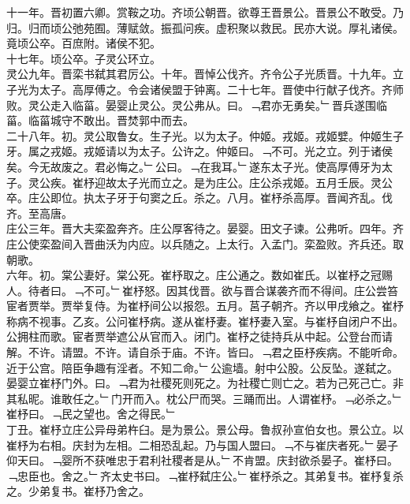 \documentclass{zhvt-classic}
\begin{document}
\hspace*{2em}十一年。晋初置六卿。赏鞍之功。齐顷公朝晋。欲尊王晋景公。晋景公不敢受。乃归。归而顷公弛苑囿。薄赋敛。振孤问疾。虚积聚以救民。民亦大说。厚礼诸侯。竟顷公卒。百庶附。诸侯不犯。\\
\hspace*{2em}十七年。顷公卒。子灵公环立。\\
\hspace*{2em}灵公九年。晋栾书弑其君厉公。十年。晋悼公伐齐。齐令公子光质晋。十九年。立子光为太子。高厚傅之。令会诸侯盟于钟离。二十七年。晋使中行献子伐齐。齐师败。灵公走入临菑。晏婴止灵公。灵公弗从。曰。﹁君亦无勇矣。﹂晋兵遂围临菑。临菑城守不敢出。晋焚郭中而去。\\
\hspace*{2em}二十八年。初。灵公取鲁女。生子光。以为太子。仲姬。戎姬。戎姬嬖。仲姬生子牙。属之戎姬。戎姬请以为太子。公许之。仲姬曰。﹁不可。光之立。列于诸侯矣。今无故废之。君必悔之。﹂公曰。﹁在我耳。﹂遂东太子光。使高厚傅牙为太子。灵公疾。崔杼迎故太子光而立之。是为庄公。庄公杀戎姬。五月壬辰。灵公卒。庄公即位。执太子牙于句窦之丘。杀之。八月。崔杼杀高厚。晋闻齐乱。伐齐。至高唐。\\
\hspace*{2em}庄公三年。晋大夫栾盈奔齐。庄公厚客待之。晏婴。田文子谏。公弗听。四年。齐庄公使栾盈间入晋曲沃为内应。以兵随之。上太行。入孟门。栾盈败。齐兵还。取朝歌。\\
\hspace*{2em}六年。初。棠公妻好。棠公死。崔杼取之。庄公通之。数如崔氏。以崔杼之冠赐人。待者曰。﹁不可。﹂崔杼怒。因其伐晋。欲与晋合谋袭齐而不得间。庄公尝笞宦者贾举。贾举复侍。为崔杼间公以报怨。五月。莒子朝齐。齐以甲戌飨之。崔杼称病不视事。乙亥。公问崔杼病。遂从崔杼妻。崔杼妻入室。与崔杼自闭户不出。公拥柱而歌。宦者贾举遮公从官而入。闭门。崔杼之徒持兵从中起。公登台而请解。不许。请盟。不许。请自杀于庙。不许。皆曰。﹁君之臣杼疾病。不能听命。近于公宫。陪臣争趣有淫者。不知二命。﹂公逾墙。射中公股。公反坠。遂弑之。晏婴立崔杼门外。曰。﹁君为社稷死则死之。为社稷亡则亡之。若为己死己亡。非其私昵。谁敢任之。﹂门开而入。枕公尸而哭。三踊而出。人谓崔杼。﹁必杀之。﹂崔杼曰。﹁民之望也。舍之得民。﹂\\
\hspace*{2em}丁丑。崔杼立庄公异母弟杵臼。是为景公。景公母。鲁叔孙宣伯女也。景公立。以崔杼为右相。庆封为左相。二相恐乱起。乃与国人盟曰。﹁不与崔庆者死。﹂晏子仰天曰。﹁婴所不获唯忠于君利社稷者是从。﹂不肯盟。庆封欲杀晏子。崔杼曰。﹁忠臣也。舍之。﹂齐太史书曰。﹁崔杼弑庄公。﹂崔杼杀之。其弟复书。崔杼复杀之。少弟复书。崔杼乃舍之。\\
\end{document}
